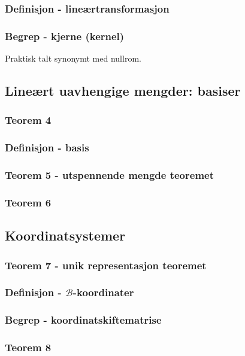 \documentclass{article}
\begin{document}
      \subsubsection{Definisjon - lineærtransformasjon}
        
      \subsubsection{Begrep - kjerne (kernel)}
        Praktisk talt synonymt med nullrom.
    \subsection{Lineært uavhengige mengder: basiser}
      \subsubsection{Teorem 4}
        
      \subsubsection{Definisjon - basis}
        
      \subsubsection{Teorem 5 - utspennende mengde teoremet}
        
      \subsubsection{Teorem 6}
        
    \subsection{Koordinatsystemer}
      \subsubsection{Teorem 7 - unik representasjon teoremet}
        
      \subsubsection{Definisjon - $\mathcal{B}$-koordinater}
        
      \subsubsection{Begrep - koordinatskiftematrise}
        
      \subsubsection{Teorem 8}
        
\end{document}
